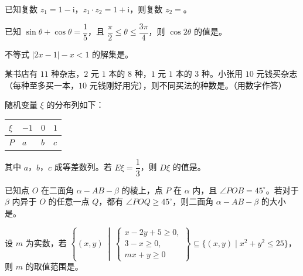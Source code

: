 \begin{question}
已知复数 $z_1=1-\mathrm i$，$z_1\cdot z_2=1+\mathrm i$，则复数 $z_2=$\gkblank{}。

\end{question}
\begin{question}
已知 $\sin\theta+\cos\theta=\dfrac15$，且 $\dfrac{\pi}{2}\leqslant\theta\leqslant\dfrac{3\pi}{4}$，则 $\cos2\theta$ 的值是\gkblank{}。

\end{question}
\begin{question}
不等式 $|2x-1|-x<1$ 的解集是\gkblank{}。

\end{question}
\begin{question}
某书店有 $11$ 种杂志，$2$ 元 $1$ 本的 $8$ 种，$1$ 元 $1$ 本的 $3$ 种。小张用 $10$ 元钱买杂志（每种至多买一本，$10$ 元钱刚好用完），则不同买法的种数是\gkblank{}。（用数字作答）

\end{question}
\begin{question}
随机变量 $\xi$ 的分布列如下：

\begin{center}
\begin{tabular}{llll}
\toprule
$\xi$ & $-1$ & $0$ & $1$ \\
\midrule
$P$ & $a$ & $b$ & $c$ \\
\bottomrule
\end{tabular}
\end{center}

其中 $a$，$b$，$c$ 成等差数列。若 $E\xi=\dfrac13$，则 $D\xi$ 的值是\gkblank{}。

\end{question}
\begin{question}
已知点 $O$ 在二面角 $\alpha-AB-\beta$ 的棱上，点 $P$ 在 $\alpha$ 内，且 $\angle POB=45^\circ$。若对于 $\beta$ 内异于 $O$ 的任意一点 $Q$，都有 $\angle POQ\geqslant45^\circ$，则二面角 $\alpha-AB-\beta$ 的大小是\gkblank{}。

\end{question}
\begin{question}
设 $m$ 为实数，若 $\left\{(x,y)\ \middle|\ \begin{cases}x-2y+5\geqslant0,\\ 3-x\geqslant0,\\ mx+y\geqslant0\end{cases}\right\}\subseteq\{(x,y)\mid x^2+y^2\leqslant25\}$，则 $m$ 的取值范围是\gkblank{}。

\end{question}

